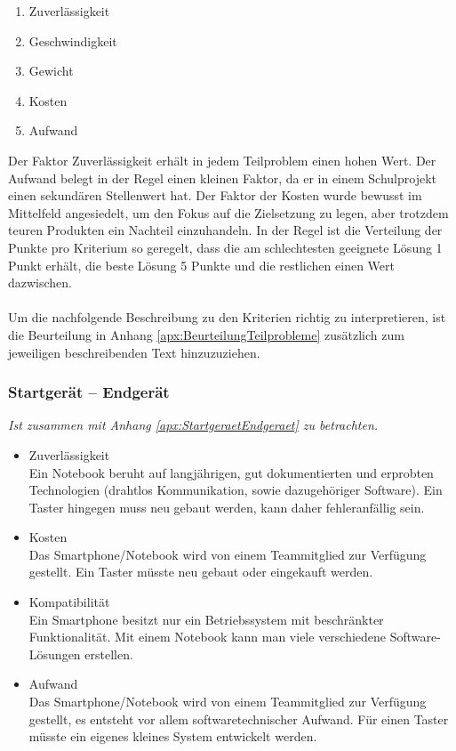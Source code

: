 		\begin{enumerate}
			\item Zuverlässigkeit
			\item Geschwindigkeit
			\item Gewicht
			\item Kosten
			\item Aufwand
		\end{enumerate}		
		Der Faktor Zuverlässigkeit erhält in jedem Teilproblem einen hohen Wert. Der Aufwand belegt in der Regel einen kleinen Faktor, da er in einem Schulprojekt einen sekundären Stellenwert hat. Der Faktor der Kosten wurde bewusst im Mittelfeld angesiedelt, um den Fokus auf die Zielsetzung zu legen, aber trotzdem teuren Produkten ein Nachteil einzuhandeln.
		In der Regel ist die Verteilung der Punkte pro Kriterium so geregelt, dass die am schlechtesten geeignete Lösung 1 Punkt erhält, die beste Lösung 5 Punkte und die restlichen einen Wert dazwischen.\\
		\\
		Um die nachfolgende Beschreibung zu den Kriterien richtig zu interpretieren, ist die Beurteilung in Anhang \ref{apx:BeurteilungTeilprobleme} zusätzlich zum jeweiligen beschreibenden Text hinzuzuziehen. 
		
		\subsubsection{Startgerät – Endgerät}
			\textit{Ist zusammen mit Anhang \ref{apx:StartgeraetEndgeraet} zu betrachten.}
			\begin{itemize}
				\item Zuverlässigkeit\\
				Ein Notebook beruht auf langjährigen, gut dokumentierten und erprobten Technologien (drahtlos Kommunikation, sowie dazugehöriger Software). Ein Taster hingegen muss neu gebaut werden, kann daher fehleranfällig sein.
				\item Kosten\\
				Das Smartphone/Notebook wird von einem Teammitglied zur Verfügung gestellt. Ein Taster müsste neu gebaut oder eingekauft werden.
				\item Kompatibilität\\
				Ein Smartphone besitzt nur ein Betriebssystem mit beschränkter Funktionalität. Mit einem Notebook kann man viele verschiedene Software-Lösungen erstellen.
				\item Aufwand\\
				Das Smartphone/Notebook wird von einem Teammitglied zur Verfügung gestellt, es entsteht vor allem softwaretechnischer Aufwand. Für einen Taster müsste ein eigenes kleines System entwickelt werden.
			\end{itemize}
			
